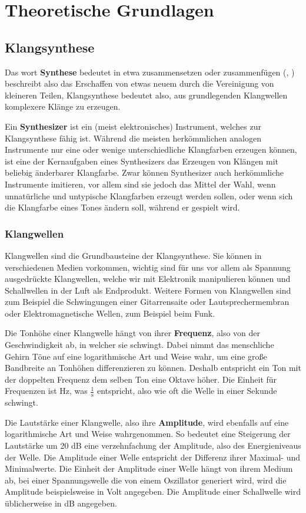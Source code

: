 \chapter{Theoretische Grundlagen}

\section{Klangsynthese}
\label{sec:org7079eb5}
Das wort \textbf{Synthese} bedeutet in etwa zusammensetzen oder zusammenfügen (, ) beschreibt also das Erschaffen von etwas neuem durch die Vereinigung von kleineren Teilen, Klangsynthese bedeutet also, aus grundlegenden Klangwellen komplexere Klänge zu erzeugen.

Ein \textbf{Synthesizer} ist ein (meist elektronisches) Instrument, welches zur Klangsynthese fähig ist. Während die meisten herkömmlichen analogen Instrumente nur eine oder wenige unterschiedliche Klangfarben erzeugen können, ist eine der Kernaufgaben eines Synthesizers das Erzeugen von Klängen mit beliebig änderbarer Klangfarbe. Zwar können Synthesizer auch herkömmliche Instrumente imitieren, vor allem sind sie jedoch das Mittel der Wahl, wenn unnatürliche und untypische Klangfarben erzeugt werden sollen, oder wenn sich die Klangfarbe eines Tones ändern soll, während er gespielt wird.

\subsection{Klangwellen}
\label{sec:org25d2865}
Klangwellen sind die Grundbausteine der Klangsynthese. Sie können in verschiedenen Medien vorkommen, wichtig sind für uns vor allem als Spannung ausgedrückte Klangwellen, welche wir mit Elektronik manipulieren können und Schallwellen in der Luft als Endprodukt. Weitere Formen von Klangwellen sind zum Beispiel die Schwingungen einer Gitarrensaite oder Lautsprechermembran oder Elektromagnetische Wellen, zum Beispiel beim Funk.

Die Tonhöhe einer Klangwelle hängt von ihrer \textbf{Frequenz}, also von der Geschwindigkeit ab, in welcher sie schwingt. Dabei nimmt das menschliche Gehirn Töne auf eine logarithmische Art und Weise wahr, um eine große Bandbreite an Tonhöhen differenzieren zu können. Deshalb entspricht ein Ton mit der doppelten Frequenz dem selben Ton eine Oktave höher. Die Einheit für Frequenzen ist \si{\hertz}, was \(\frac{1}{\si{\second}}\) entspricht, also wie oft die Welle in einer Sekunde schwingt.

Die Lautstärke einer Klangwelle, also ihre \textbf{Amplitude}, wird ebenfalls auf eine logarithmische Art und Weise wahrgenommen. So bedeutet eine Steigerung der Lautstärke um 20 \si{\dB} eine verzehnfachung der Amplitude, also des Energieniveaus der Welle. Die Amplitude einer Welle entspricht der Differenz ihrer Maximal- und Minimalwerte. Die Einheit der Amplitude einer Welle hängt von ihrem Medium ab, bei einer Spannungswelle die von einem Oszillator generiert wird, wird die Amplitude beispielsweise in Volt angegeben. Die Amplitude einer Schallwelle wird üblicherweise in \si{\dB} angegeben.

